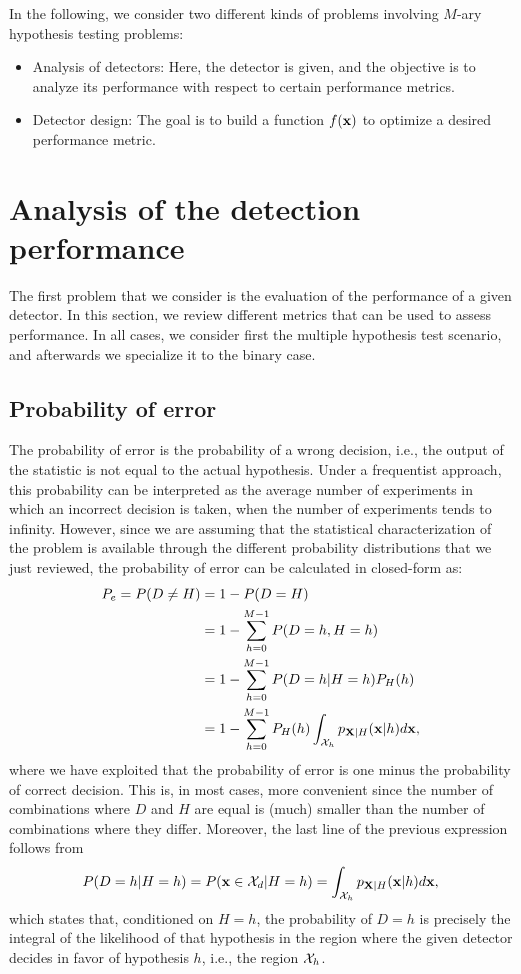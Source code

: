 In the following, we consider two different kinds of problems involving $M$-ary hypothesis testing problems:
\begin{itemize}
	\item Analysis of detectors: Here, the detector is given, and the objective is to analyze its performance with respect to certain performance metrics.
	\item Detector design: The goal is to build a function $f(\bf x)$ to optimize a desired performance metric.
\end{itemize}

\section{Analysis of the detection performance}
\label{subsec:analysis}

The first problem that we consider is the evaluation of the performance of a given detector. In this section, we review different metrics that can be used to assess performance. In all cases, we consider first the multiple hypothesis test scenario, and afterwards we specialize it to the binary case.

\subsection{Probability of error}

The probability of error is the probability of a wrong decision, i.e., the output of the statistic is not equal to the actual hypothesis. Under a frequentist approach, this probability can be interpreted as the average number of experiments in which an incorrect decision is taken, when the number of experiments tends to infinity. However, since we are assuming that the statistical characterization of the problem is available through the different probability distributions that we just reviewed, the probability of error can be calculated in closed-form as:
\begin{align}
    P_e = P(D\neq H) & = 1 - P(D=H) \nonumber \\
    & = 1 - \sum_{h=0}^{M-1} P(D=h, H=h) \nonumber \\
    & = 1 - \sum_{h=0}^{M-1} P(D=h| H=h) P_H(h) \nonumber \\
    & = 1 - \sum_{h=0}^{M-1} P_H(h) \int_{{\cal X}_h} p_{{\bf X}|H}({\bf x}|h) d{\bf x},\nonumber
\end{align}
where we have exploited that the probability of error is one minus the probability of correct decision. This is, in most cases, more convenient since the number of combinations where $D$ and $H$ are equal is (much) smaller than the number of combinations where they differ. Moreover, the last line of the previous expression follows from
$$P(D=h| H=h) = P({\bf x}\in {\cal X}_d| H=h) = \int_{{\cal X}_h} p_{{\bf X}|H}({\bf x}|h) d{\bf x},$$
which states that, conditioned on $H=h$, the probability of $D=h$ is precisely the integral of the likelihood of that hypothesis in the region where the given detector decides in favor of hypothesis $h$, i.e., the region ${\cal X}_h$.

